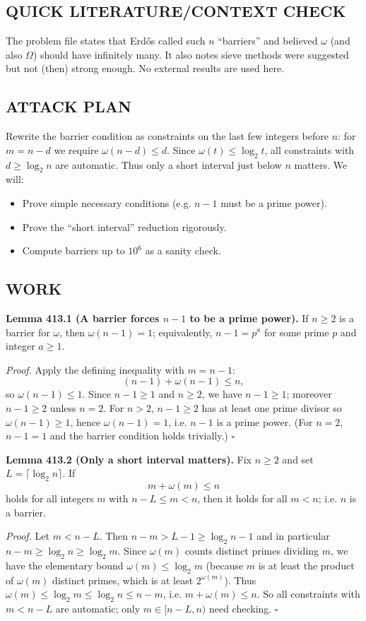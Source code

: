 \subsection*{QUICK LITERATURE/CONTEXT CHECK}
The problem file states that Erd\H{o}s called such $n$ ``barriers'' and believed $\omega$ (and also $\Omega$) should have infinitely many.
It also notes sieve methods were suggested but not (then) strong enough.
No external results are used here.

\subsection*{ATTACK PLAN}
Rewrite the barrier condition as constraints on the last few integers before $n$:
for $m=n-d$ we require $\omega(n-d)\le d$.
Since $\omega(t)\le \log_2 t$, all constraints with $d\ge \log_2 n$ are automatic.
Thus only a short interval just below $n$ matters.
We will:
\begin{itemize}
  \item Prove simple necessary conditions (e.g. $n-1$ must be a prime power).
  \item Prove the ``short interval'' reduction rigorously.
  \item Compute barriers up to $10^6$ as a sanity check.
\end{itemize}

\subsection*{WORK}
\textbf{Lemma 413.1 (A barrier forces $n-1$ to be a prime power).}
If $n\ge2$ is a barrier for $\omega$, then $\omega(n-1)=1$; equivalently, $n-1=p^a$ for some prime $p$ and integer $a\ge1$.

\textit{Proof.}
Apply the defining inequality with $m=n-1$:
$$(n-1)+\omega(n-1)\le n,$$
so $\omega(n-1)\le 1$.
Since $n-1\ge1$ and $n\ge2$, we have $n-1\ge1$; moreover $n-1\ge2$ unless $n=2$.
For $n>2$, $n-1\ge2$ has at least one prime divisor so $\omega(n-1)\ge1$, hence $\omega(n-1)=1$, i.e. $n-1$ is a prime power.
(For $n=2$, $n-1=1$ and the barrier condition holds trivially.)
\hfill$\square$

\textbf{Lemma 413.2 (Only a short interval matters).}
Fix $n\ge2$ and set $L=\lceil \log_2 n\rceil$.
If
$$m+\omega(m)\le n$$
holds for all integers $m$ with $n-L\le m<n$, then it holds for all $m<n$; i.e. $n$ is a barrier.

\textit{Proof.}
Let $m<n-L$.
Then $n-m> L-1 \ge \log_2 n -1$ and in particular $n-m\ge \log_2 n\ge \log_2 m$.
Since $\omega(m)$ counts distinct primes dividing $m$, we have the elementary bound $\omega(m)\le \log_2 m$ (because $m$ is at least the product of $\omega(m)$ distinct primes, which is at least $2^{\omega(m)}$).
Thus $\omega(m)\le \log_2 m\le \log_2 n\le n-m$, i.e. $m+\omega(m)\le n$.
So all constraints with $m<n-L$ are automatic; only $m\in[n-L,n)$ need checking.
\hfill$\square$

